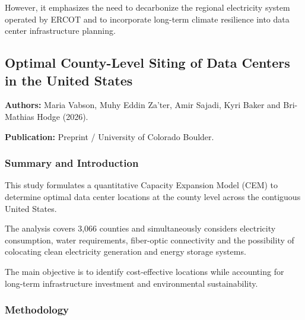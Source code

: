 However, it emphasizes the need to decarbonize the regional electricity system operated by ERCOT and to incorporate long-term climate resilience into data center infrastructure planning.



\subsection{Optimal County-Level Siting of Data Centers in the United States}
\label{sec:dc_paper_3}

\noindent
\textbf{Authors:} Maria Vabson, Muhy Eddin Za'ter, Amir Sajadi, Kyri Baker and Bri-Mathias Hodge (2026).

\noindent
\textbf{Publication:} Preprint / University of Colorado Boulder.

\subsubsection{Summary and Introduction}

This study formulates a quantitative Capacity Expansion Model (CEM) to determine optimal data center locations at the county level across the contiguous United States.

The analysis covers 3,066 counties and simultaneously considers electricity consumption, water requirements, fiber-optic connectivity and the possibility of colocating clean electricity generation and energy storage systems.

The main objective is to identify cost-effective locations while accounting for long-term infrastructure investment and environmental sustainability.

\subsubsection{Methodology}

